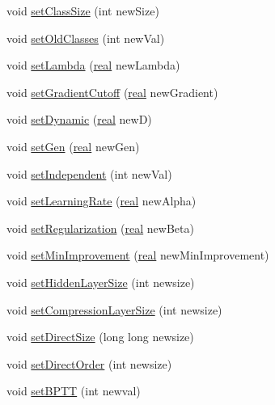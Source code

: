 \begin{DoxyCompactItemize}
void \hyperlink{class_c_rnn_l_m_a51616292c6ad998df87c51d73494692d}{set\+Class\+Size} (int new\+Size)
\item 
void \hyperlink{class_c_rnn_l_m_aa634eb4d6cfc72c97b881d04e612ff23}{set\+Old\+Classes} (int new\+Val)
\item 
void \hyperlink{class_c_rnn_l_m_a4d1040988ed894e3238183263aa75758}{set\+Lambda} (\hyperlink{rnnlmlib_8h_a11d147c64891830c9e79b3315b1b2e21}{real} new\+Lambda)
\item 
void \hyperlink{class_c_rnn_l_m_af550d8eaa0383ba3b8255c363bfd4b3a}{set\+Gradient\+Cutoff} (\hyperlink{rnnlmlib_8h_a11d147c64891830c9e79b3315b1b2e21}{real} new\+Gradient)
\item 
void \hyperlink{class_c_rnn_l_m_a211389ff5c8c960e99fd261ca31dc38a}{set\+Dynamic} (\hyperlink{rnnlmlib_8h_a11d147c64891830c9e79b3315b1b2e21}{real} newD)
\item 
void \hyperlink{class_c_rnn_l_m_a23b6059ce1323b4edcbeb64e0b812943}{set\+Gen} (\hyperlink{rnnlmlib_8h_a11d147c64891830c9e79b3315b1b2e21}{real} new\+Gen)
\item 
void \hyperlink{class_c_rnn_l_m_a0d3ca274074347a4802c78c269e51c31}{set\+Independent} (int new\+Val)
\item 
void \hyperlink{class_c_rnn_l_m_ab57bcc67a75a8b4efd653d1cd8052a13}{set\+Learning\+Rate} (\hyperlink{rnnlmlib_8h_a11d147c64891830c9e79b3315b1b2e21}{real} new\+Alpha)
\item 
void \hyperlink{class_c_rnn_l_m_aea7c338c02e265b94cb3d9a932d6845b}{set\+Regularization} (\hyperlink{rnnlmlib_8h_a11d147c64891830c9e79b3315b1b2e21}{real} new\+Beta)
\item 
void \hyperlink{class_c_rnn_l_m_ace3b58964c174b24f5885a806c9896fb}{set\+Min\+Improvement} (\hyperlink{rnnlmlib_8h_a11d147c64891830c9e79b3315b1b2e21}{real} new\+Min\+Improvement)
\item 
void \hyperlink{class_c_rnn_l_m_a608da9c1bce4dc9cc71ff195c45a4c61}{set\+Hidden\+Layer\+Size} (int newsize)
\item 
void \hyperlink{class_c_rnn_l_m_a97192e9d73341668036c2e408bbd3f4a}{set\+Compression\+Layer\+Size} (int newsize)
\item 
void \hyperlink{class_c_rnn_l_m_abf738b3b416cae07c34c740b8d336bf4}{set\+Direct\+Size} (long long newsize)
\item 
void \hyperlink{class_c_rnn_l_m_a82fd5876649906108a0895ae22643e4f}{set\+Direct\+Order} (int newsize)
\item 
void \hyperlink{class_c_rnn_l_m_a4a09324d50e680abc116a11aa7736aea}{set\+B\+P\+TT} (int newval)

\end{DoxyCompactItemize}
